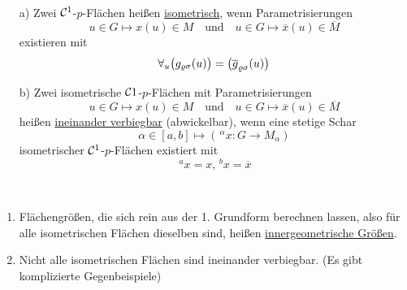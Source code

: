 \begin{definition}\(\)
\begin{enumerate}
 \item[a)] Zwei \(\mathcal{C}^1\)-\(p\)-Flächen heißen \uline{isometrisch}, wenn Parametrisierungen
 \[
  u \in G \mapsto x(u) \in M \quad \text{und} \quad u \in G \mapsto \overline x(u) \in \overline M
 \]
 existieren mit 
 \[
  \forall_u \big(g_{\varrho \sigma} (u) \big) = \big(\overline g_{\varrho \sigma} (u) \big)
 \]
 \item[b)] Zwei isometrische \(\mathcal{C}1\)-\(p\)-Flächen mit Parametrisierungen
 \[
  u \in G \mapsto x(u) \in M \quad \text{und}\quad u \in G \mapsto \overline x (u) \in \overline M
 \]
 heißen \uline{ineinander verbiegbar} (abwickelbar), wenn eine stetige Schar
 \[
  \alpha \in [a,b] \mapsto (\,^\alpha x \colon G \to M_\alpha)
 \]
 isometrischer \(\mathcal{C}^1\)-\(p\)-Flächen existiert mit
 \[
  \,^a x = x, \,^b x = \overline x
 \]

\end{enumerate}

\end{definition}

\begin{bemerkung}\(\)
 \begin{enumerate}
  \item Flächengrößen, die sich rein aus der 1. Grundform berechnen lassen, also für alle isometrischen Flächen dieselben sind, heißen \uline{innergeometrische Größen}.
  \item Nicht alle isometrischen Flächen sind ineinander verbiegbar. (Es gibt komplizierte Gegenbeispiele)
 \end{enumerate}

\end{bemerkung}

